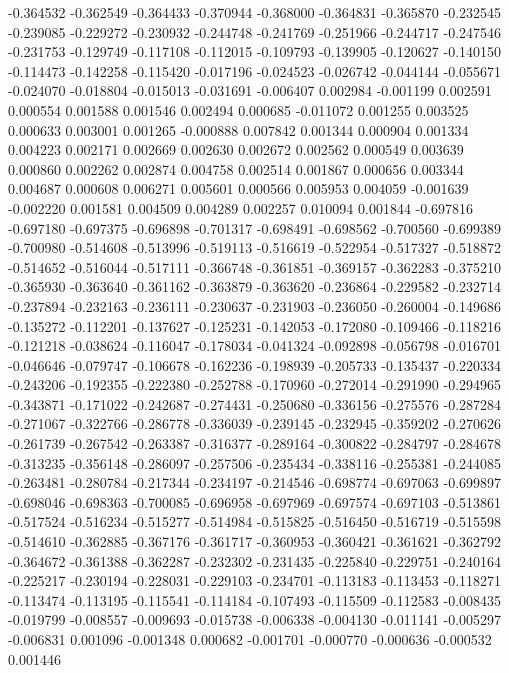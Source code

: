 -0.364532
-0.362549
-0.364433
-0.370944
-0.368000
-0.364831
-0.365870
-0.232545
-0.239085
-0.229272
-0.230932
-0.244748
-0.241769
-0.251966
-0.244717
-0.247546
-0.231753
-0.129749
-0.117108
-0.112015
-0.109793
-0.139905
-0.120627
-0.140150
-0.114473
-0.142258
-0.115420
-0.017196
-0.024523
-0.026742
-0.044144
-0.055671
-0.024070
-0.018804
-0.015013
-0.031691
-0.006407
0.002984
-0.001199
0.002591
0.000554
0.001588
0.001546
0.002494
0.000685
-0.011072
0.001255
0.003525
0.000633
0.003001
0.001265
-0.000888
0.007842
0.001344
0.000904
0.001334
0.004223
0.002171
0.002669
0.002630
0.002672
0.002562
0.000549
0.003639
0.000860
0.002262
0.002874
0.004758
0.002514
0.001867
0.000656
0.003344
0.004687
0.000608
0.006271
0.005601
0.000566
0.005953
0.004059
-0.001639
-0.002220
0.001581
0.004509
0.004289
0.002257
0.010094
0.001844
-0.697816
-0.697180
-0.697375
-0.696898
-0.701317
-0.698491
-0.698562
-0.700560
-0.699389
-0.700980
-0.514608
-0.513996
-0.519113
-0.516619
-0.522954
-0.517327
-0.518872
-0.514652
-0.516044
-0.517111
-0.366748
-0.361851
-0.369157
-0.362283
-0.375210
-0.365930
-0.363640
-0.361162
-0.363879
-0.363620
-0.236864
-0.229582
-0.232714
-0.237894
-0.232163
-0.236111
-0.230637
-0.231903
-0.236050
-0.260004
-0.149686
-0.135272
-0.112201
-0.137627
-0.125231
-0.142053
-0.172080
-0.109466
-0.118216
-0.121218
-0.038624
-0.116047
-0.178034
-0.041324
-0.092898
-0.056798
-0.016701
-0.046646
-0.079747
-0.106678
-0.162236
-0.198939
-0.205733
-0.135437
-0.220334
-0.243206
-0.192355
-0.222380
-0.252788
-0.170960
-0.272014
-0.291990
-0.294965
-0.343871
-0.171022
-0.242687
-0.274431
-0.250680
-0.336156
-0.275576
-0.287284
-0.271067
-0.322766
-0.286778
-0.336039
-0.239145
-0.232945
-0.359202
-0.270626
-0.261739
-0.267542
-0.263387
-0.316377
-0.289164
-0.300822
-0.284797
-0.284678
-0.313235
-0.356148
-0.286097
-0.257506
-0.235434
-0.338116
-0.255381
-0.244085
-0.263481
-0.280784
-0.217344
-0.234197
-0.214546
-0.698774
-0.697063
-0.699897
-0.698046
-0.698363
-0.700085
-0.696958
-0.697969
-0.697574
-0.697103
-0.513861
-0.517524
-0.516234
-0.515277
-0.514984
-0.515825
-0.516450
-0.516719
-0.515598
-0.514610
-0.362885
-0.367176
-0.361717
-0.360953
-0.360421
-0.361621
-0.362792
-0.364672
-0.361388
-0.362287
-0.232302
-0.231435
-0.225840
-0.229751
-0.240164
-0.225217
-0.230194
-0.228031
-0.229103
-0.234701
-0.113183
-0.113453
-0.118271
-0.113474
-0.113195
-0.115541
-0.114184
-0.107493
-0.115509
-0.112583
-0.008435
-0.019799
-0.008557
-0.009693
-0.015738
-0.006338
-0.004130
-0.011141
-0.005297
-0.006831
0.001096
-0.001348
0.000682
-0.001701
-0.000770
-0.000636
-0.000532
0.001446
